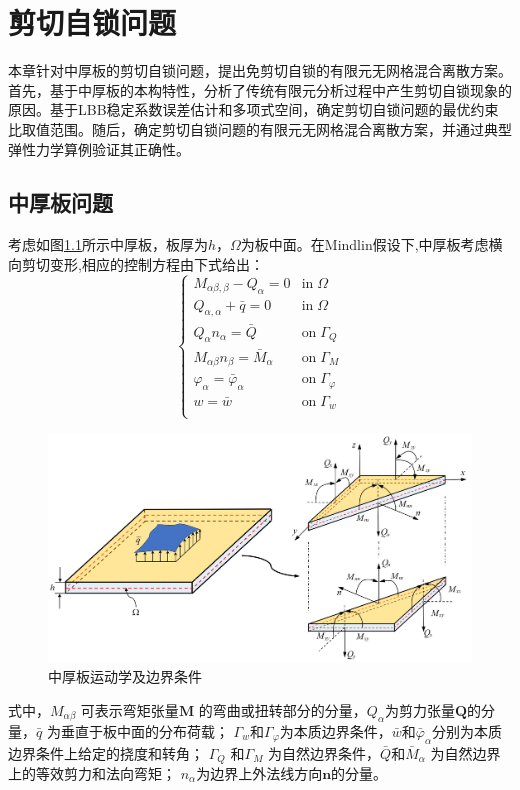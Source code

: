\chapter{剪切自锁问题}
本章针对中厚板的剪切自锁问题，提出免剪切自锁的有限元无网格混合离散方案。首先，基于中厚板的本构特性，分析了传统有限元分析过程中产生剪切自锁现象的原因。基于LBB稳定系数误差估计和多项式空间，确定剪切自锁问题的最优约束比取值范围。随后，确定剪切自锁问题的有限元无网格混合离散方案，并通过典型弹性力学算例验证其正确性。
\section{中厚板问题}    
考虑如图\ref{ch_5:fig:mindlin_picture}所示中厚板，板厚为$h$，$\Omega$为板中面。在Mindlin假设下,中厚板考虑横向剪切变形,相应的控制方程由下式给出：
\begin{equation}\label{ch_5:eq:strong_mindlin}
    \begin{cases}
        M_{\alpha\beta,\beta} - Q_\alpha = 0 & \textrm{in}\; \Omega \\
        Q_{\alpha,\alpha} + \bar q = 0 & \textrm{in}\; \Omega \\    Q_\alpha n_\alpha = \bar Q & \textrm{on}\; \Gamma_Q \\
        M_{\alpha\beta} n_\beta = \bar M_\alpha & \textrm{on}\; \Gamma_M \\
        \varphi_\alpha = \bar \varphi_\alpha & \textrm{on}\; \Gamma_\varphi \\
        w = \bar w & \textrm{on}\; \Gamma_w \\
    \end{cases}
\end{equation}
\begin{figure}[!h]
    \centering 
        \includegraphics[scale=0.4]{figures/ch_5/Mindlinplate.png}
        \caption{中厚板运动学及边界条件}\label{ch_5:fig:mindlin_picture}
\end{figure}
式中，$M_{\alpha \beta}$ 可表示弯矩张量$ \boldsymbol{M}$ 的弯曲或扭转部分的分量，$Q_\alpha$为剪力张量$\boldsymbol{Q}$的分量，$\bar{q}$ 为垂直于板中面的分布荷载；
$\Gamma_w$和$\Gamma_\varphi$为本质边界条件，$\bar{w}$和$\bar{\varphi}_\alpha$分别为本质边界条件上给定的挠度和转角；
$\Gamma_Q$ 和$\Gamma_M$ 为自然边界条件，$\bar Q$和$\bar{M}_{\alpha}$ 为自然边界上的等效剪力和法向弯矩；
$n_\alpha$为边界上外法线方向$\pmb{n}$的分量。


